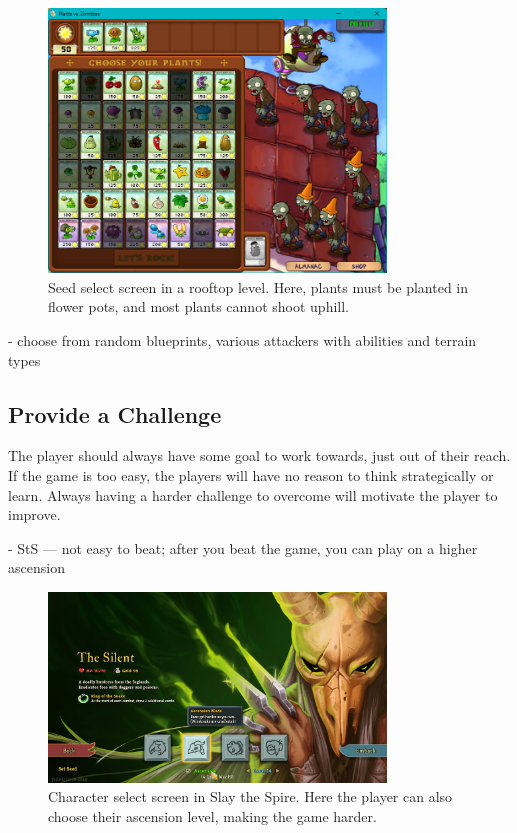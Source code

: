 \begin{figure}[htb]
    \centering
    \includegraphics[width=0.8\textwidth]{img/Plants-vs-Zombies-Rooftop.png}
    \caption{Seed select screen in a rooftop level. Here, plants must be planted in flower pots, and most plants cannot shoot uphill.}
    \label{fig:plants-vs-zombies-roof}
\end{figure}

- choose from random blueprints, various attackers with abilities and terrain types

\subsection{Provide a Challenge} \label{sec:goal-challenge}

The player should always have some goal to work towards, just out of their reach.
If the game is too easy, the players will have no reason to think strategically or learn.
Always having a harder challenge to overcome will motivate the player to improve.

- StS --- not easy to beat; after you beat the game, you can play on a higher ascension

\begin{figure}
    \centering
    \includegraphics[width=0.8\textwidth]{img/Slay-the-Spire-Ascension.png}
    \caption{Character select screen in Slay the Spire. Here the player can also choose their ascension level, making the game harder.}
    \label{fig:slay-the-spire-ascension}
\end{figure}

